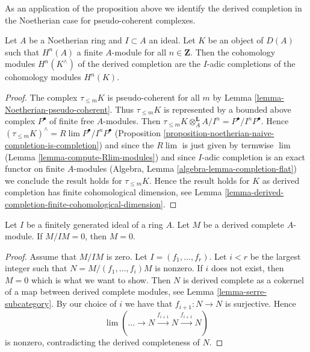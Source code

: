 \noindent
As an application of the proposition above we identify the derived
completion in the Noetherian case for pseudo-coherent complexes.

\begin{lemma}
\label{lemma-derived-completion-pseudo-coherent}
Let $A$ be a Noetherian ring and $I \subset A$ an ideal. Let $K$ be an
object of $D(A)$ such that $H^n(A)$ a finite $A$-module for all
$n \in \mathbf{Z}$. Then the cohomology modules $H^n(K^\wedge)$ of
the derived completion are the $I$-adic
completions of the cohomology modules $H^n(K)$.
\end{lemma}

\begin{proof}
The complex $\tau_{\leq m}K$ is pseudo-coherent for all $m$
by Lemma \ref{lemma-Noetherian-pseudo-coherent}.
Thus $\tau_{\leq m}K$ is represented by a bounded above complex
$P^\bullet$ of finite free $A$-modules. Then
$\tau_{\leq m}K \otimes_A^\mathbf{L} A/I^n = P^\bullet/I^nP^\bullet$.
Hence $(\tau_{\leq m}K)^\wedge = R\lim P^\bullet/I^nP^\bullet$
(Proposition \ref{proposition-noetherian-naive-completion-is-completion})
and since the $R\lim$ is just given by termwise $\lim$
(Lemma \ref{lemma-compute-Rlim-modules}) and since
$I$-adic completion is an exact functor on finite $A$-modules
(Algebra, Lemma \ref{algebra-lemma-completion-flat}) we conclude
the result holds for $\tau_{\leq m}K$. Hence the result holds for
$K$ as derived completion has finite cohomological dimension, see
Lemma \ref{lemma-derived-completion-finite-cohomological-dimension}.
\end{proof}

\begin{lemma}
\label{lemma-derived-complete-zero}
Let $I$ be a finitely generated ideal of a ring $A$.
Let $M$ be a derived complete $A$-module.
If $M/IM = 0$, then $M = 0$.
\end{lemma}

\begin{proof}
Assume that $M/IM$ is zero. Let $I = (f_1, \ldots, f_r)$.
Let $i < r$ be the largest integer such that $N = M/(f_1, \ldots, f_i)M$
is nonzero. If $i$ does not exist, then $M = 0$ which is what we
want to show. Then $N$ is derived complete as a cokernel
of a map between derived complete modules, see
Lemma \ref{lemma-serre-subcategory}.
By our choice of $i$ we have that $f_{i + 1} : N \to N$ is surjective.
Hence
$$
\lim (\ldots \to N \xrightarrow{f_{i + 1}} N \xrightarrow{f_{i + 1}} N)
$$
is nonzero, contradicting the derived completeness of $N$.
\end{proof}


